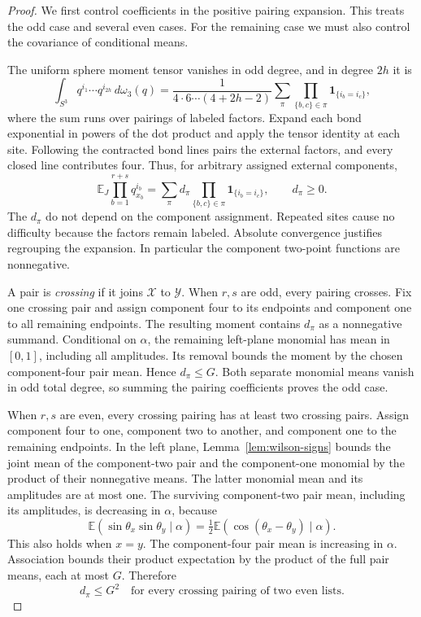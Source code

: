 \begin{proof}
We first control coefficients in the positive pairing expansion.
This treats the odd case and several even cases. For the remaining
case we must also control the covariance of conditional means.

The uniform sphere moment tensor vanishes in odd degree, and
in degree $2h$ it is
\[
 \int_{S^3}q^{i_1}\cdots q^{i_{2h}}\,d\omega_3(q)
 =\frac{1}{4\cdot6\cdots(4+2h-2)}
   \sum_{\pi}\prod_{\{b,c\}\in\pi}\mathbf1_{\{i_b=i_c\}},
\]
where the sum runs over pairings of labeled factors. Expand each
bond exponential in powers of the dot product and apply the tensor
identity at each site. Following the contracted bond lines pairs
the external factors, and every closed line contributes four.
Thus, for arbitrary assigned external components,
\begin{equation}
 \mathbb E_J\prod_{b=1}^{r+s}q_{x_b}^{i_b}
 =\sum_\pi d_\pi
       \prod_{\{b,c\}\in\pi}\mathbf1_{\{i_b=i_c\}},
 \qquad d_\pi\ge0.
 \label{eq:wilson-pairings}
\end{equation}
The $d_\pi$ do not depend on the component assignment.
Repeated sites cause no difficulty because the factors remain
labeled. Absolute convergence justifies regrouping the expansion.
In particular the component two-point functions are nonnegative.

A pair is \emph{crossing} if it joins $\mathcal X$ to $\mathcal Y$.
When $r,s$ are odd, every pairing crosses. Fix one crossing pair
and assign component four to its endpoints and component one to
all remaining endpoints. The resulting moment contains $d_\pi$
as a nonnegative summand. Conditional on $\alpha$, the remaining
left-plane monomial has mean in $[0,1]$, including all amplitudes.
Its removal bounds the moment by the chosen component-four pair
mean. Hence $d_\pi\le G$. Both separate monomial means vanish
in odd total degree, so summing the pairing coefficients proves
the odd case.

When $r,s$ are even, every crossing pairing has at least two
crossing pairs. Assign component four to one, component two to
another, and component one to the remaining endpoints.
In the left plane, Lemma~\ref{lem:wilson-signs} bounds the joint
mean of the component-two pair and the component-one monomial
by the product of their nonnegative means. The latter monomial
mean and its amplitudes are at most one. The surviving
component-two pair mean, including its amplitudes, is decreasing
in $\alpha$, because
\[
 \mathbb E(\sin\theta_x\sin\theta_y\mid\alpha)
 =\tfrac12\mathbb E(\cos(\theta_x-\theta_y)\mid\alpha).
\]
This also holds when $x=y$. The component-four pair mean is
increasing in $\alpha$. Association bounds their product
expectation by the product of the full pair means, each at most $G$.
Therefore
\begin{equation}
 d_\pi\le G^2
 \quad\text{for every crossing pairing of two even lists}.
 \label{eq:wilson-crossing}
\end{equation}


\end{proof}
